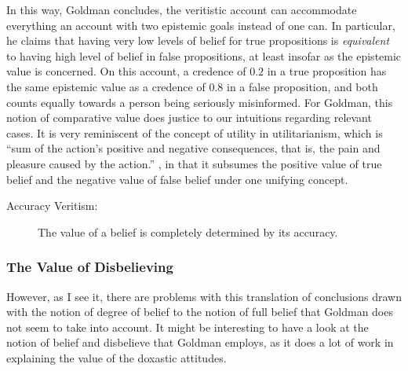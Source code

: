 \documentclass[12pt,numbers=noenddot]{scrartcl}
\begin{document}
In this way, Goldman concludes, the veritistic account can accommodate everything an account with two epistemic goals instead of one can. In particular, he claims that having very low levels of belief for true propositions is \emph{equivalent} to having high level of belief in false propositions, at least insofar as the epistemic value is concerned. On this account, a credence of $0.2$ in a true proposition has the same epistemic value as a credence of $0.8$ in a false proposition, and both counts equally towards a person being seriously misinformed. For Goldman, this notion of comparative value does justice to our intuitions regarding relevant cases. It is very reminiscent of the concept of utility in utilitarianism, which is “sum of the action's positive and negative consequences, that is, the pain and pleasure caused by the action.” \autocite{depaul_value_2001}, in that it subsumes the positive value of true belief and the negative value of false belief under one unifying concept.

\begin{description}
    \item[Accuracy Veritism:] The value of a belief is completely determined by its accuracy.
\end{description}

\subsubsection{The Value of Disbelieving}

However, as I see it, there are problems with this translation of conclusions drawn with the notion of degree of belief to the notion of full belief that Goldman does not seem to take into account. It might be interesting to have a look at the notion of belief and disbelieve that Goldman employs, as it does a lot of work in explaining the value of the doxastic attitudes.
\end{document}

